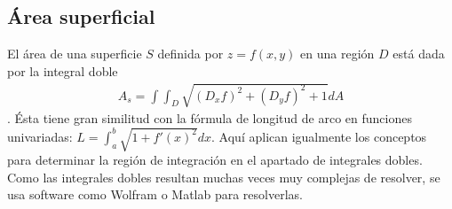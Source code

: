 \documentclass[12pt, letterpaper]{report}
\begin{document}
\subsection*{Área superficial}
El área de una superficie $S$ definida por $z = f(x, y)$ en una región $D$ está dada por la integral doble
\begin{align}
A_s = \int \int_D \sqrt{(D_xf)^2 + (D_yf)^2 + 1} dA
\end{align}. Ésta tiene gran similitud con la fórmula de longitud de arco en funciones univariadas: $L = \int_{a}^{b} \sqrt{1 + f'(x)^2} dx$. Aquí aplican 
igualmente los conceptos para determinar la región de integración en el apartado de integrales dobles. Como las integrales 
dobles resultan muchas veces muy complejas de resolver, se usa software como Wolfram o Matlab para resolverlas. 
\end{document}
